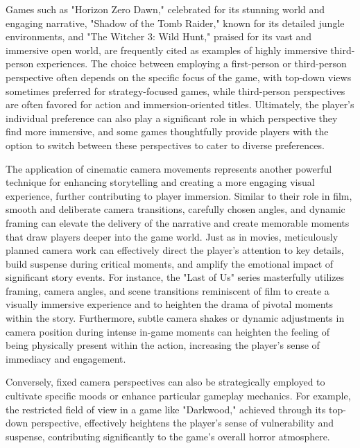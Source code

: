 \documentclass{article}
\begin{document}
    Games such as "Horizon Zero Dawn," celebrated for its stunning world and engaging narrative, "Shadow of the Tomb Raider," known for its detailed jungle environments, and "The Witcher 3: Wild Hunt," praised for its vast and immersive open world, are frequently cited as examples of highly immersive third-person experiences. The choice between employing a first-person or third-person perspective often depends on the specific focus of the game, with top-down views sometimes preferred for strategy-focused games, while third-person perspectives are often favored for action and immersion-oriented titles. Ultimately, the player's individual preference can also play a significant role in which perspective they find more immersive, and some games thoughtfully provide players with the option to switch between these perspectives to cater to diverse preferences.

    The application of cinematic camera movements represents another powerful technique for enhancing storytelling and creating a more engaging visual experience, further contributing to player immersion. Similar to their role in film, smooth and deliberate camera transitions, carefully chosen angles, and dynamic framing can elevate the delivery of the narrative and create memorable moments that draw players deeper into the game world. Just as in movies, meticulously planned camera work can effectively direct the player's attention to key details, build suspense during critical moments, and amplify the emotional impact of significant story events. For instance, the "Last of Us" series masterfully utilizes framing, camera angles, and scene transitions reminiscent of film to create a visually immersive experience and to heighten the drama of pivotal moments within the story. Furthermore, subtle camera shakes or dynamic adjustments in camera position during intense in-game moments can heighten the feeling of being physically present within the action, increasing the player's sense of immediacy and engagement.

    Conversely, fixed camera perspectives can also be strategically employed to cultivate specific moods or enhance particular gameplay mechanics. For example, the restricted field of view in a game like "Darkwood," achieved through its top-down perspective, effectively heightens the player's sense of vulnerability and suspense, contributing significantly to the game's overall horror atmosphere.
\end{document}
